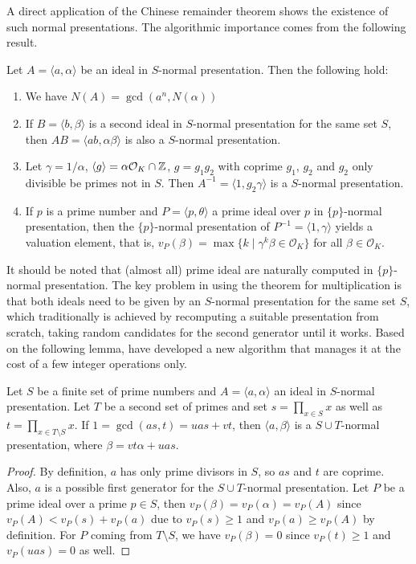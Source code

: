 \documentclass{sig-alternate-05-2015}
\begin{document}
A direct application of the Chinese remainder theorem shows the existence of such normal presentations.
The algorithmic importance comes from the following result.

\begin{theorem}
Let $A = \langle a, \alpha \rangle$ be an ideal in $S$-normal presentation. Then the following hold:
\begin{enumerate}
\item We have $N(A) = \gcd(a^n, N(\alpha))$
\item If $B = \langle b, \beta\rangle$ is a second ideal in $S$-normal
presentation for the same set $S$, then
$AB = \langle ab, \alpha\beta\rangle$ is also a $S$-normal presentation.
\item Let $\gamma = 1/\alpha$, $\langle g\rangle = \alpha \mathcal O_K \cap \mathbb{Z}$,
 $g = g_1g_2$ with coprime $g_1$, $g_2$ and $g_2$ only divisible be primes not in $S$. Then $A^{-1} = \langle 1, g_2\gamma\rangle$ is a $S$-normal presentation.
\item If $p$ is a prime number and $P= \langle p, \theta\rangle$ a prime ideal over $p$
in $\{p\}$-normal presentation, then the $\{p\}$-normal presentation
of $P^{-1} = \langle 1, \gamma\rangle$ yields a valuation element, that is,
$v_P(\beta) = \max\{ k \mid \gamma^k\beta\in \mathcal O_K\}$ for all $\beta \in \mathcal O_K$.
\end{enumerate}
\end{theorem}

It should be noted that (almost all) prime ideal are naturally computed
in $\{p\}$-normal presentation. The key problem in using the theorem for
multiplication is that both ideals need to be given by an $S$-normal presentation for
the same set $S$, which traditionally is achieved by recomputing
a suitable presentation from scratch, taking random candidates for the
second generator until it works. Based on the following lemma, have developed a new algorithm that manages it at the cost 
of a few integer operations only.

\begin{lemma}
Let $S$ be a finite set of prime numbers and $A=\langle a, \alpha\rangle$ an ideal in
$S$-normal presentation. Let $T$ be a second set of primes and set
$s = \prod_{x\in S} x$ as well as $t = \prod_{x\in T\setminus S} x$. If $1 = \gcd(as, t) = uas + vt$,
then $\langle a, \beta \rangle$ is a $S\cup T$-normal presentation, where $\beta = vt\alpha + uas$.
\end{lemma}

\begin{proof}
By definition, $a$ has only prime divisors in $S$, so $as$ and $t$ are coprime.
Also, $a$ is a possible first generator for the $S\cup T$-normal presentation.
Let $P$ be a prime ideal over a prime $p\in S$, then
$v_P(\beta) = v_P(\alpha)= v_P(A)$ since $v_P(A) <v_P(s)+v_P(a)$ due to $v_P(s)\ge 1$ and $v_P(a) \ge v_P(A)$ by definition.
For $P$ coming from $T\setminus S$, we have $v_P(\beta) = 0$ since $v_P(t)\ge 1$ and $v_P(uas) = 0$ as well.
\end{proof}
\end{document}
